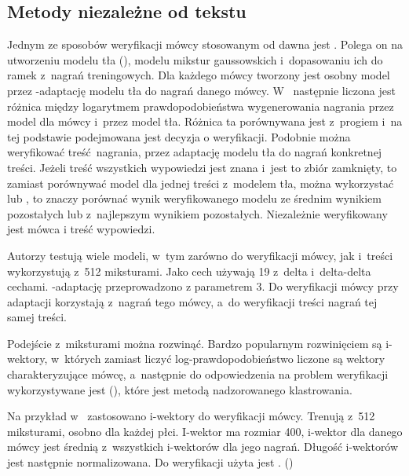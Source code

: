 \subsection{Metody niezależne od tekstu}

Jednym ze sposobów weryfikacji mówcy stosowanym od dawna jest . Polega on na utworzeniu modelu tła
(), modelu mikstur gaussowskich i~dopasowaniu ich do ramek  z~nagrań
treningowych. Dla każdego mówcy tworzony jest osobny model przez -adaptację modelu tła do nagrań danego
mówcy. W~\cite{utteranceVerificationFor}
następnie liczona jest różnica między logarytmem prawdopodobieństwa wygenerowania nagrania przez model
dla mówcy i~przez model tła. Różnica ta porównywana jest z~progiem i~na tej podstawie podejmowana jest decyzja
o weryfikacji. Podobnie można weryfikować treść nagrania, przez adaptację modelu tła do nagrań konkretnej treści.
Jeżeli treść wszystkich wypowiedzi jest znana i~jest to zbiór zamknięty, to zamiast porównywać model dla jednej
treści z~modelem tła, można wykorzystać  lub , to znaczy porównać wynik weryfikowanego
modelu ze średnim wynikiem pozostałych lub z~najlepszym wynikiem pozostałych. Niezależnie weryfikowany jest mówca
i treść wypowiedzi.

Autorzy testują wiele modeli, w~tym zarówno do weryfikacji mówcy, jak i~treści wykorzystują  z~512 miksturami.
Jako cech używają 19  z~delta i~delta-delta cechami. -adaptację przeprowadzono
z parametrem  3.
Do weryfikacji mówcy przy adaptacji korzystają z~nagrań tego mówcy, a~do weryfikacji treści nagrań tej samej treści.

Podejście z~miksturami można rozwinąć. Bardzo popularnym rozwinięciem są i-wektory, w~których
zamiast liczyć log-prawdopodobieństwo liczone są wektory charakteryzujące mówcę, a~następnie do
odpowiedzenia na problem weryfikacji wykorzystywane
jest  (), które jest metodą nadzorowanego klastrowania.

Na przykład w~\cite{utteranceVerificationFor}
zastosowano i-wektory do weryfikacji mówcy. Trenują  z~512 miksturami, osobno dla każdej płci.
I-wektor ma rozmiar 400, i-wektor dla danego mówcy jest średnią z~wszystkich i-wektorów dla jego nagrań.
Długość i-wektorów jest następnie normalizowana. Do weryfikacji użyta jest .
()

